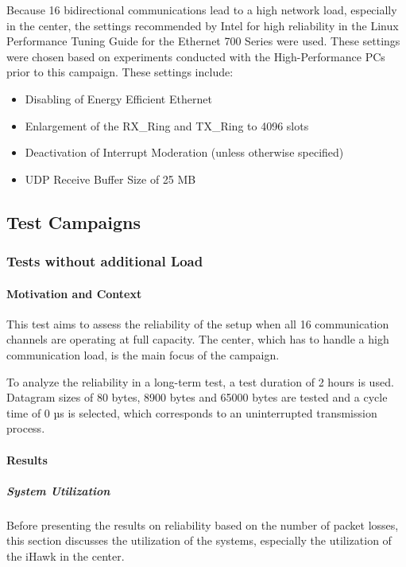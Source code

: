 Because 16 bidirectional communications lead to a high network load, especially in the center, the settings recommended by Intel for high reliability in the Linux Performance Tuning Guide for the Ethernet 700 Series \cite{intermod03} were used. These settings were chosen based on experiments conducted with the High-Performance PCs prior to this campaign. These settings include:
\begin{itemize}
  \item Disabling of Energy Efficient Ethernet
  \item Enlargement of the RX\_Ring and TX\_Ring to 4096 slots
  \item Deactivation of Interrupt Moderation (unless otherwise specified)
  \item UDP Receive Buffer Size of 25 MB
\end{itemize}

\subsection{Test Campaigns}

\subsubsection{Tests without additional Load} \label{chap:noaddloadTest}
\paragraph{Motivation and Context}
This test aims to assess the reliability of the setup when all 16 communication channels are operating at full capacity. The center, which has to handle a high communication load, is the main focus of the campaign.

To analyze the reliability in a long-term test, a test duration of 2 hours is used. Datagram sizes of 80 bytes, 8900 bytes and 65000 bytes are tested and a cycle time of 0 µs is selected, which corresponds to an uninterrupted transmission process.

\paragraph{Results}
\subparagraph{System Utilization}
Before presenting the results on reliability based on the number of packet losses, this section discusses the utilization of the systems, especially the utilization of the iHawk in the center.

